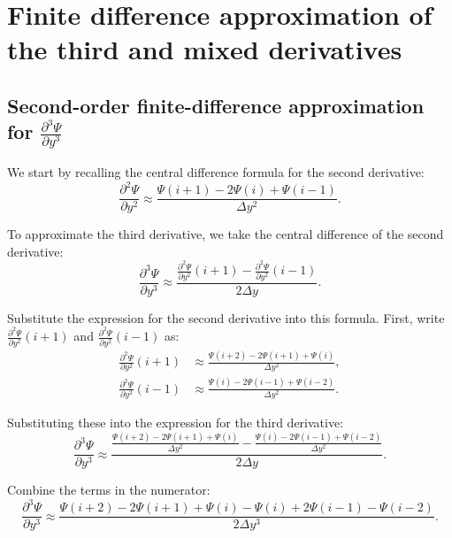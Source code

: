 \documentclass{article}
\begin{document}
\section{Finite difference approximation of the third and mixed derivatives}

\subsection{Second-order finite-difference approximation for \texorpdfstring{$\frac{\partial^3 \Psi}{\partial y^3}$}{d3Psi/dy3}}

We start by recalling the central difference formula for the second derivative:
\begin{equation}
\frac{\partial^2 \Psi}{\partial y^2} \approx \frac{\Psi(i+1) - 2\Psi(i) + \Psi(i-1)}{\Delta y^2}.
\end{equation}

To approximate the third derivative, we take the central difference of the second derivative:
\begin{equation}
\frac{\partial^3 \Psi}{\partial y^3} \approx \frac{\frac{\partial^2 \Psi}{\partial y^2}(i+1) - \frac{\partial^2 \Psi}{\partial y^2}(i-1)}{2\Delta y}.
\end{equation}

Substitute the expression for the second derivative into this formula. First, write $\frac{\partial^2 \Psi}{\partial y^2}(i+1)$ and $\frac{\partial^2 \Psi}{\partial y^2}(i-1)$ as:
\begin{align}
\frac{\partial^2 \Psi}{\partial y^2}(i+1) &\approx \frac{\Psi(i+2) - 2\Psi(i+1) + \Psi(i)}{\Delta y^2}, \\
\frac{\partial^2 \Psi}{\partial y^2}(i-1) &\approx \frac{\Psi(i) - 2\Psi(i-1) + \Psi(i-2)}{\Delta y^2}.
\end{align}

Substituting these into the expression for the third derivative:
\begin{equation}
\frac{\partial^3 \Psi}{\partial y^3} \approx \frac{\frac{\Psi(i+2) - 2\Psi(i+1) + \Psi(i)}{\Delta y^2} - \frac{\Psi(i) - 2\Psi(i-1) + \Psi(i-2)}{\Delta y^2}}{2\Delta y}.
\end{equation}

Combine the terms in the numerator:
\begin{equation}
\frac{\partial^3 \Psi}{\partial y^3} \approx \frac{\Psi(i+2) - 2\Psi(i+1) + \Psi(i) - \Psi(i) + 2\Psi(i-1) - \Psi(i-2)}{2\Delta y^3}.
\end{equation}
\end{document}
